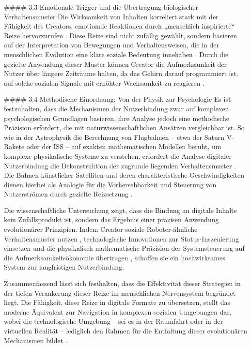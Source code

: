 \documentclass[11pt,a4paper]{article}
\begin{document}
\#\#\#\# 3.3 Emotionale Trigger und die Übertragung biologischer Verhaltensmuster Die Wirksamkeit von Inhalten korreliert stark mit der Fähigkeit des Creators, emotionale Reaktionen durch „menschlich inspirierte“ Reize hervorzurufen \autocite{arxiv_2301_09025}. Diese Reize sind nicht zufällig gewählt, sondern basieren auf der Interpretation von Bewegungen und Verhaltensweisen, die in der menschlichen Evolution eine klare soziale Bedeutung innehaben \autocite{arxiv_2301_09025}. Durch die gezielte Anwendung dieser Muster können Creator die Aufmerksamkeit der Nutzer über längere Zeiträume halten, da das Gehirn darauf programmiert ist, auf solche sozialen Signale mit erhöhter Wachsamkeit zu reagieren \autocite{arxiv_2301_09025}.

\#\#\#\# 3.4 Methodische Einordnung: Von der Physik zur Psychologie Es ist festzuhalten, dass die Mechanismen der Nutzerbindung zwar auf komplexen psychologischen Grundlagen basieren, ihre Analyse jedoch eine methodische Präzision erfordert, die mit naturwissenschaftlichen Ansätzen vergleichbar ist. So wie in der Astrophysik die Berechnung von Flugbahnen – etwa der Saturn V-Rakete oder der ISS – auf exakten mathematischen Modellen beruht, um komplexe physikalische Systeme zu verstehen, erfordert die Analyse digitaler Nutzerbindung die Dekonstruktion der zugrunde liegenden Verhaltensmuster \autocite{arxiv_1912_05973,arxiv_1912_05975}. Die Bahnen künstlicher Satelliten und deren charakteristische Geschwindigkeiten dienen hierbei als Analogie für die Vorhersehbarkeit und Steuerung von Nutzerströmen durch gezielte Reizsetzung \autocite{arxiv_1912_05975}.

Die wissenschaftliche Untersuchung zeigt, dass die Bindung an digitale Inhalte kein Zufallsprodukt ist, sondern das Ergebnis einer präzisen Anwendung evolutionärer Prinzipien. Indem Creator soziale Roboter-ähnliche Verhaltensmuster nutzen \autocite{arxiv_2301_09025}, technologische Innovationen zur Status-Inszenierung einsetzen \autocite{arxiv_1709_01020} und die physikalisch-mathematische Präzision der Systemsteuerung auf die Aufmerksamkeitsökonomie übertragen \autocite{arxiv_1912_05973}, schaffen sie ein hochwirksames System zur langfristigen Nutzerbindung.

Zusammenfassend lässt sich festhalten, dass die Effektivität dieser Strategien in der tiefen Verankerung dieser Reize im menschlichen Nervensystem begründet liegt. Die Fähigkeit, diese Reize in digitale Formate zu übersetzen, stellt das moderne Äquivalent zur Navigation in komplexen sozialen Umgebungen dar, wobei die technologische Umgebung – sei es in der Raumfahrt oder in der virtuellen Realität – lediglich den Rahmen für die Entfaltung dieser evolutionären Mechanismen bildet \autocite{arxiv_1912_05975,arxiv_1709_01020}.
\end{document}
